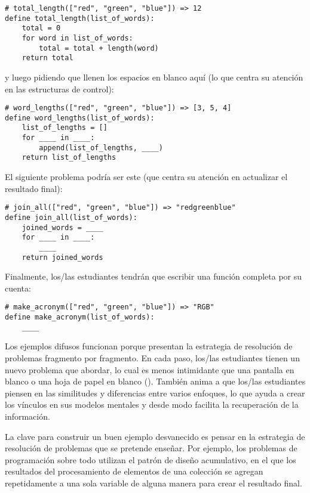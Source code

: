 \begin{verbatim}
# total_length(["red", "green", "blue"]) => 12
define total_length(list_of_words):
    total = 0
    for word in list_of_words:
        total = total + length(word)
    return total
\end{verbatim}

\noindent

y luego pidiendo que llenen los espacios en blanco aquí
(lo que centra su atención en las estructuras de control):


\begin{verbatim}
# word_lengths(["red", "green", "blue"]) => [3, 5, 4]
define word_lengths(list_of_words):
    list_of_lengths = []
    for ____ in ____:
        append(list_of_lengths, ____)
    return list_of_lengths
\end{verbatim}

El siguiente problema podría ser este
(que centra su atención en actualizar el resultado final):

\begin{verbatim}
# join_all(["red", "green", "blue"]) => "redgreenblue"
define join_all(list_of_words):
    joined_words = ____
    for ____ in ____:
        ____
    return joined_words
\end{verbatim}

Finalmente, los/las estudiantes tendrán que escribir una función completa por su cuenta:

\begin{verbatim}
# make_acronym(["red", "green", "blue"]) => "RGB"
define make_acronym(list_of_words):
    ____
\end{verbatim}

Los ejemplos difusos funcionan porque
presentan la estrategia de resolución de problemas fragmento por fragmento.
En cada paso,
los/las estudiantes tienen un nuevo problema que abordar,
lo cual es menos intimidante que una pantalla en blanco o una hoja de papel en blanco ().
También anima a que los/las estudiantes piensen en las similitudes y diferencias entre varios enfoques,
lo que ayuda a crear los vínculos en sus modelos mentales y desde modo facilita la recuperación de la información.

La clave para construir un buen ejemplo desvanecido es
pensar en la estrategia de resolución de problemas que se pretende enseñar.
Por ejemplo,
los problemas de programación sobre todo utilizan el patrón de diseño acumulativo,
en el que los resultados del procesamiento de elementos de una colección
se agregan repetidamente a una sola variable de alguna manera para crear el resultado final.


